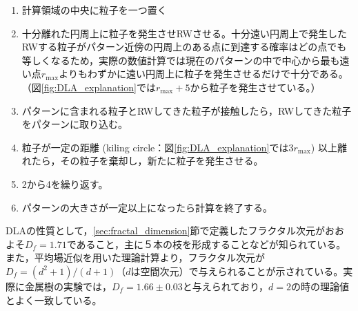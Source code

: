 \documentclass[autodetect-engine,dvi=dvipdfmx,a4paper,ja=standard,oneside,openany,11pt]{bxjsbook}
\begin{document}
\begin{enumerate}
  \item 計算領域の中央に粒子を一つ置く
  \item 十分離れた円周上に粒子を発生させRWさせる。十分遠い円周上で発生したRWする粒子がパターン近傍の円周上のある点に到達する確率はどの点でも等しくなるため，実際の数値計算では現在のパターンの中で中心から最も遠い点$r_\mathrm{max}$よりもわずかに遠い円周上に粒子を発生させるだけで十分である。（図\ref{fig:DLA_explanation}では$r_{\mathrm{max}}+5$から粒子を発生させている。）
  \item パターンに含まれる粒子とRWしてきた粒子が接触したら，RWしてきた粒子をパターンに取り込む。
  \item 粒子が一定の距離 (kiling circle：図\ref{fig:DLA_explanation}では$3r_{\mathrm{max}}$) 以上離れたら，その粒子を棄却し，新たに粒子を発生させる。
  \item 2から4を繰り返す。
  \item パターンの大きさが一定以上になったら計算を終了する。
\end{enumerate}

DLAの性質として，\ref{sec:fractal_dimension}節で定義したフラクタル次元がおおよそ$D_f=1.71$であること\cite{太田正之輔2009dla}，主に５本の枝を形成することなどが知られている\cite{ohta2004mode}。また，平均場近似を用いた理論計算より，フラクタル次元が$D_f=(d^2+1)/(d+1)$（$d$は空間次元）で与えられる\cite{muthukumar1983mean}\cite{tokuyama1984fractal}ことが示されている。実際に金属樹の実験\cite{matsushita1984fractal}では，$D_f=1.66\pm0.03$と与えられており，$d=2$の時の理論値とよく一致している。

\ifdraft{
  
  
}{}
\end{document}

